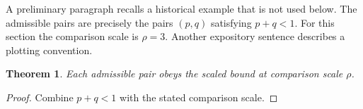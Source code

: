 \documentclass{article}
\newtheorem{theorem}{Theorem}
\begin{document}
A preliminary paragraph recalls a historical example that is not used below.
The admissible pairs are precisely the pairs $(p,q)$ satisfying $p+q<1$.
For this section the comparison scale is $\rho=3$.
Another expository sentence describes a plotting convention.
\begin{theorem}\label{thm:admissible}
Each admissible pair obeys the scaled bound at comparison scale $\rho$.
\end{theorem}
\begin{proof}
Combine $p+q<1$ with the stated comparison scale.
\end{proof}
\end{document}
